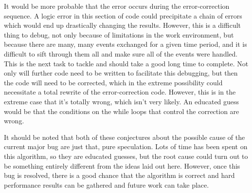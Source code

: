 It would be more probable that the error occurs during the error-correction sequence.  A logic error in this section of code could precipitate a chain of errors which would end up drastically changing the results.  However, this is a difficult thing to debug, not only because of limitations in the work environment, but because there are many, many events exchanged for a given time period, and it is difficult to sift through them all and make sure all of the events were handled.  This is the next task to tackle and should take a good long time to complete.  Not only will further code need to be written to facilitate this debugging, but then the code will need to be corrected, which in the extreme possibility could necessitate a total rewrite of the error-correction code.  However, this is in the extreme case that it's totally wrong, which isn't very likely.  An educated guess would be that the conditions on the while loops that control the correction are wrong.

It should be noted that both of these conjectures about the possible cause of the current major bug are just that, pure speculation.  Lots of time has been spent on this algorithm, so they are educated guesses, but the root cause could turn out to be something entirely different from the ideas laid out here.  However, once this bug is resolved, there is a good chance that the algorithm is correct and hard performance results can be gathered and future work can take place.